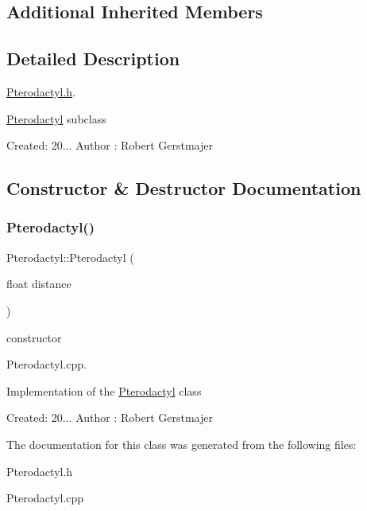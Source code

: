 \subsection*{Additional Inherited Members}


\subsection{Detailed Description}
\mbox{\hyperlink{_pterodactyl_8h_source}{Pterodactyl.\+h}}. 

\mbox{\hyperlink{class_pterodactyl}{Pterodactyl}} subclass

Created\+: 20... Author \+: Robert Gerstmajer 

\subsection{Constructor \& Destructor Documentation}
\mbox{\label{class_pterodactyl_a4a43eda1d2298cfbce3f2f4a1b223e2a}} 
\subsubsection{\texorpdfstring{Pterodactyl()}{Pterodactyl()}}
{\footnotesize\ttfamily Pterodactyl\+::\+Pterodactyl (\begin{DoxyParamCaption}\item[{float}]{distance }\end{DoxyParamCaption})}



constructor 

Pterodactyl.\+cpp.

Implementation of the \mbox{\hyperlink{class_pterodactyl}{Pterodactyl}} class

Created\+: 20... Author \+: Robert Gerstmajer 

The documentation for this class was generated from the following files\+:\begin{DoxyCompactItemize}
\item 
Pterodactyl.\+h\item 
Pterodactyl.\+cpp\end{DoxyCompactItemize}
